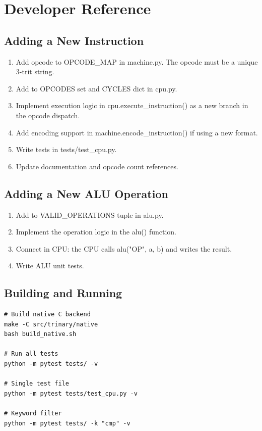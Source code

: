 \documentclass[12pt,a4paper,twoside]{book}
\theoremstyle{trinarytheorem}
\theoremstyle{trinarydefinition}
\newcommand{\code}[1]{\textsf{#1}}
\begin{document}
\chapter{Developer Reference}
\label{app:devguide}

\section{Adding a New Instruction}

\begin{enumerate}
    \item Add opcode to \code{OPCODE\_MAP} in \code{machine.py}. The opcode must
          be a unique 3-trit string.
    \item Add to \code{OPCODES} set and \code{CYCLES} dict in \code{cpu.py}.
    \item Implement execution logic in \code{cpu.execute\_instruction()} as a new
          branch in the opcode dispatch.
    \item Add encoding support in \code{machine.encode\_instruction()} if using a new
          format.
    \item Write tests in \code{tests/test\_cpu.py}.
    \item Update documentation and opcode count references.
\end{enumerate}

\section{Adding a New ALU Operation}

\begin{enumerate}
    \item Add to \code{VALID\_OPERATIONS} tuple in \code{alu.py}.
    \item Implement the operation logic in the \code{alu()} function.
    \item Connect in CPU: the CPU calls \code{alu("OP", a, b)} and writes the result.
    \item Write ALU unit tests.
\end{enumerate}

\section{Building and Running}

\begin{verbatim}
# Build native C backend
make -C src/trinary/native
bash build_native.sh

# Run all tests
python -m pytest tests/ -v

# Single test file
python -m pytest tests/test_cpu.py -v

# Keyword filter
python -m pytest tests/ -k "cmp" -v
\end{verbatim}
\end{document}
